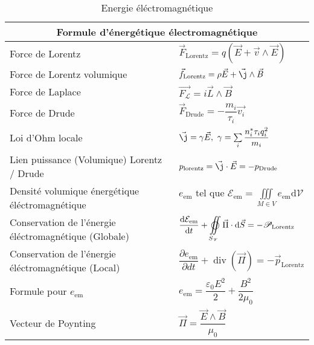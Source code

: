 \documentclass[10pt,a4paper,titlepage,landscape]{article}
\renewcommand{\d}
{
    \mathrm{d}
}
\newcommand*{\dv}[2]
{
    \dfrac{\d#1}{\d#2}
}
\newcommand*{\dpv}[2]
{
    \dfrac{\partial#1}{\partial#2}
}
\renewcommand{\div}
{
    \operatorname{div}
}
\renewcommand{\arraystretch}{2}
\begin{document}
\begin{table}[H]
    \centering
    \renewcommand{\arraystretch}{1.5} %
    \setlength{\tabcolsep}{8pt} %
    \begin{tabular}{@{}|p{9cm}|p{10cm}@{}|}

        \multicolumn{2}{c}{\textbf{Formule d'énergétique électromagnétique}} \\ \hline

    Force de Lorentz & $\vec{F}_{\text{Lorentz}} = q \left(\vec{E} + \vec{v} \wedge \vec{E}\right)$ \\ \hline 
    Force de Lorentz volumique & $\vec{{f}}_{\text{Lorentz}} = \rho \vec{E} + \vec{\j}\wedge \vec{B}$ \\ \hline 
    Force de Laplace & $\vec{F_\mathscr{L}}=i\vec{L}\wedge \vec{B}$ \\ \hline 
    Force de Drude & $\vec{F}_{\text{Drude}} = -\dfrac{m_i}{\tau_i}\vec{v_i}$ \\ \hline 
    Loi d'Ohm locale & $\vec{\j} = \gamma \vec{E}, \ \gamma = \sum\limits_{i}\dfrac{n_i^{*}\tau_i q_i^2}{m_i}$ \\ \hline 
    Lien puissance (Volumique) Lorentz / Drude & $p_{\text{lorentz}} = \vec{\j}\cdot\vec{E} = -p_{\text{Drude}}$ \\ \hline 
    Densité volumique énergétique éléctromagnétique & $\displaystyle e_{\text{em}} \text{ tel que } \mathcal{E}_{\text{em}} = \iiint\limits_{M\in V}e_{\text{em}} \text{d}\mathscr{V}$ \\ \hline 
    Conservation de l'énergie éléctromagnétique (Globale) & $\displaystyle\dv{\mathcal{E}_{\text{em}}}{t} + \varoiint\limits_{S_{\mathscr{V}}} \vec{\Pi} \cdot \text{d} \vec{S} = -\mathscr{P}_{\text{Lorentz}}$ \\ \hline 
    Conservation de l'énergie éléctromagnétique (Local) & $\displaystyle \dpv{e_{\text{em}}}{dt} + \div(\vec{\Pi}) = - \vec{p}_{\text{Lorentz}}$ \\ \hline 
    Formule pour $e_{\text{em}}$ & $e_{\text{em}} = \dfrac{\varepsilon_0E^2}{2} + \dfrac{B^2}{2\mu_0}$ \\ \hline 
    Vecteur de Poynting & $\vec{\Pi} = \dfrac{\vec{E} \wedge \vec{B}}{\mu_0}$ \\ \hline 
    \end{tabular}
\caption{Energie éléctromagnétique}
\label{tab:elec_energie}
\end{table}
\end{document}
